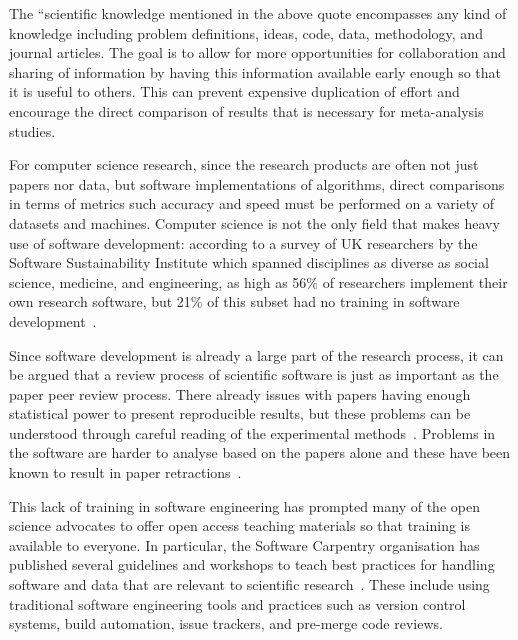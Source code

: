 The ``scientific knowledge mentioned in the above quote
encompasses any kind of knowledge including problem definitions,
ideas, code, data, methodology, and journal articles. The goal is
to allow for more opportunities for collaboration and sharing of
information by having this information available early enough so
that it is useful to others. This can prevent expensive
duplication of effort and encourage the direct comparison of
results that is necessary for meta-analysis studies.

For computer science research, since the research
products are often not just papers nor data, but software
implementations of algorithms, direct comparisons in terms of
metrics such accuracy and speed must be performed on a variety of
datasets and machines. Computer science is not the only field that
makes heavy use of software development:
according to a survey of UK researchers by the Software
Sustainability Institute which spanned disciplines as diverse as
social science, medicine, and engineering, as high as 56\% of
researchers implement their own research software, but 21\% of
this subset had no training in software
development~\autocite{SSI:hettrick_2014_14809}.

Since software development is already a large part of the research
process, it can be argued that a review process of scientific
software is just as important as the paper peer review process.
There already issues with papers having enough statistical power
to present reproducible results, but these problems can be
understood through careful reading of the experimental
methods~\autocite{Ioannidis2005,Button2013}. Problems in the software
are harder to analyse based on the papers alone and these have
been known to result in paper retractions~\autocite{Miller2006,Merali2010,Joppa2013}.

This lack of training in software engineering has prompted many of
the open science advocates to offer open access teaching
materials so that training is available to everyone.
In particular, the Software Carpentry organisation has
published several guidelines and workshops to teach best
practices for handling software and data that are relevant to
scientific research~\autocite{Wilson2006,Wilson2014}. These
include using traditional software engineering tools and practices
such as version control systems, build automation, issue
trackers, and pre-merge code reviews.

